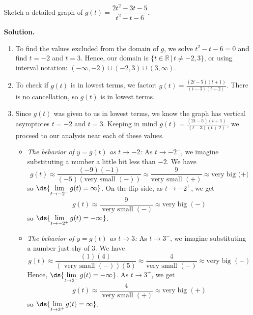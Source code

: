 \documentclass{ximera}
\begin{document}
\begin{example}  Sketch a detailed graph of $g(t) = \dfrac{2t^2-3t-5}{t^2-t-6}$.

{\bf Solution.}

\begin{enumerate}

\item  To find the values excluded from the domain of $g$, we solve  $t^2-t-6 = 0$ and find $t = -2$ and $t=3$.  Hence, our domain is $\{ t \in \mathbb{R} \, | \, t \neq -2, 3 \}$, or using interval notation: $(-\infty, -2) \cup (-2,3) \cup (3,\infty)$.

\item  To check if $g(t)$ is in lowest terms, we factor:  $g(t) = \frac{(2t-5)(t+1)}{(t-3)(t+2)}$.  There is no cancellation, so $g(t)$ is in lowest terms.

\item  Since $g(t)$ was given to us in lowest terms, we know the graph has vertical asymptotes $t=-2$ and $t=3$.  Keeping in mind $g(t) = \frac{(2t-5)(t+1)}{(t-3)(t+2)}$, we proceed to our analysis near each of these values.

\begin{itemize}

\item  \textit{The behavior of $y=g(t)$ as $t \rightarrow -2$:}  As $t \rightarrow -2^{-}$, we imagine substituting a number a little bit less than $-2$. We have \[g(t) \approx \frac{(-9)(-1)}{(-5)(\text{very small $(-)$})} \approx \frac{9}{\text{very small $(+)$}} \approx \text{very big (+)}\] so  $\ds{ \lim_{t \rightarrow -2^{-}} g(t) = \infty}$. On the flip side, as $t \rightarrow -2^{+}$, we get \[g(t) \approx \frac{9}{\text{ very small $(-)$}} \approx \text{very big $(-)$}\] so  $\ds{ \lim_{t \rightarrow -2^{+}} g(t) = -\infty}$.

\item  \textit{The behavior of $y=g(t)$ as $t \rightarrow 3$:}  As $t \rightarrow 3^{-}$, we imagine substituting a  number just shy  of $3$. We have \[g(t) \approx \frac{(1)(4)}{(\text{ very small $(-)$}) (5)} \approx \frac{4}{\text{very small $(-)$}} \approx \text{very big $(-)$}\] Hence, $\ds{ \lim_{t \rightarrow 3^{-}} g(t) = -\infty}$. As $t \rightarrow 3^{+}$, we get \[g(t) \approx \frac{4}{\text{ very small $(+)$}} \approx \text{very big $(+)$}\] so  $\ds{ \lim_{t \rightarrow 3^{+}} g(t) = \infty}$.

\end{itemize}


\end{enumerate}
\end{example}
\end{document}
